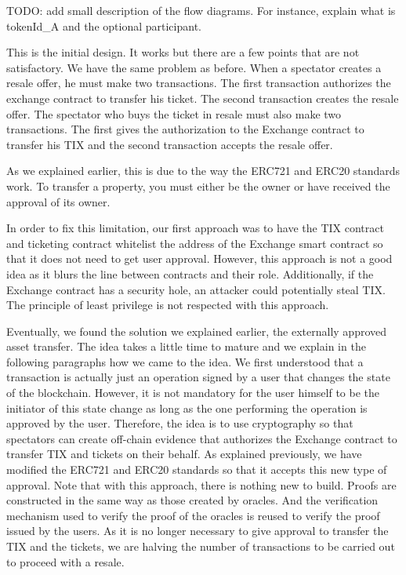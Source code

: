 \documentclass[a4paper,11pt,oneside]{report}
\begin{document}
TODO: add small description of the flow diagrams. For instance, explain what is tokenId\_A and the optional participant.

This is the initial design. It works but there are a few points that are not satisfactory. We have the same problem as before. When a spectator creates a resale offer, he must make two transactions. The first transaction authorizes the exchange contract to transfer his ticket. The second transaction creates the resale offer. The spectator who buys the ticket in resale must also make two transactions. The first gives the authorization to the Exchange contract to transfer his TIX and the second transaction accepts the resale offer.

As we explained earlier, this is due to the way the ERC721 and ERC20 standards work. To transfer a property, you must either be the owner or have received the approval of its owner.

In order to fix this limitation, our first approach was to have the TIX contract and ticketing contract whitelist the address of the Exchange smart contract so that it does not need to get user approval. However, this approach is not a good idea as it blurs the line between contracts and their role. Additionally, if the Exchange contract has a security hole, an attacker could potentially steal TIX. The principle of least privilege is not respected with this approach.

Eventually, we found the solution we explained earlier, the externally approved asset transfer. The idea takes a little time to mature and we explain in the following paragraphs how we came to the idea. We first understood that a transaction is actually just an operation signed by a user that changes the state of the blockchain. However, it is not mandatory for the user himself to be the initiator of this state change as long as the one performing the operation is approved by the user. Therefore, the idea is to use cryptography so that spectators can create off-chain evidence that authorizes the Exchange contract to transfer TIX and tickets on their behalf. As explained previously, we have modified the ERC721 and ERC20 standards so that it accepts this new type of approval. Note that with this approach, there is nothing new to build. Proofs are constructed in the same way as those created by oracles. And the verification mechanism used to verify the proof of the oracles is reused to verify the proof issued by the users. As it is no longer necessary to give approval to transfer the TIX and the tickets, we are halving the number of transactions to be carried out to proceed with a resale.
\end{document}
